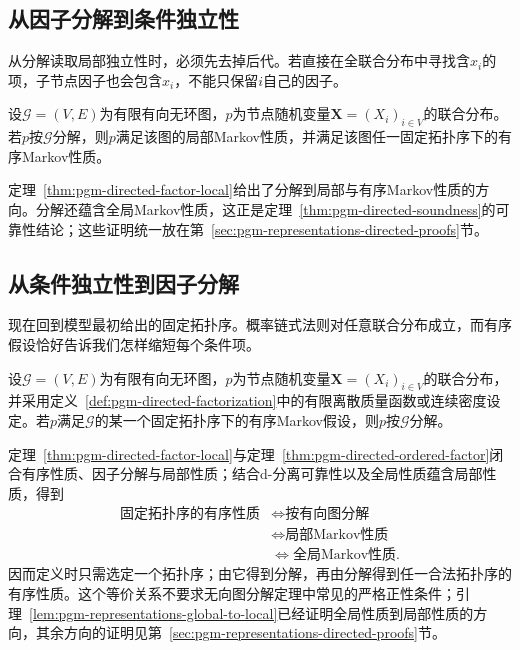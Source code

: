 \subsection{从因子分解到条件独立性}
\label{sec:pgm-directed-factor-to-ci}

从分解读取局部独立性时，必须先去掉后代。若直接在全联合分布中寻找含$x_i$的项，子节点因子也会包含$x_i$，不能只保留$i$自己的因子。

\begin{theorem}[分解蕴含局部与有序Markov性质]
  \label{thm:pgm-directed-factor-local}
  设$\mathcal{G}=(V,E)$为有限有向无环图，$p$为节点随机变量$\bm{X}=(X_i)_{i\in V}$的联合分布。若$p$按$\mathcal{G}$分解，则$p$满足该图的局部Markov性质，并满足该图任一固定拓扑序下的有序Markov性质。
\end{theorem}

定理~\ref{thm:pgm-directed-factor-local}给出了分解到局部与有序Markov性质的方向。分解还蕴含全局Markov性质，这正是定理~\ref{thm:pgm-directed-soundness}的可靠性结论；这些证明统一放在第~\ref{sec:pgm-representations-directed-proofs}节。

\subsection{从条件独立性到因子分解}
\label{sec:pgm-directed-ci-to-factor}

现在回到模型最初给出的固定拓扑序。概率链式法则对任意联合分布成立，而有序假设恰好告诉我们怎样缩短每个条件项。

\begin{theorem}[有序假设导出有向分解]
  \label{thm:pgm-directed-ordered-factor}
  设$\mathcal{G}=(V,E)$为有限有向无环图，$p$为节点随机变量$\bm{X}=(X_i)_{i\in V}$的联合分布，并采用定义~\ref{def:pgm-directed-factorization}中的有限离散质量函数或连续密度设定。若$p$满足$\mathcal{G}$的某一个固定拓扑序下的有序Markov假设，则$p$按$\mathcal{G}$分解。
\end{theorem}

定理~\ref{thm:pgm-directed-factor-local}与定理~\ref{thm:pgm-directed-ordered-factor}闭合有序性质、因子分解与局部性质；结合d-分离可靠性以及全局性质蕴含局部性质，得到
\begin{equation}
  \begin{aligned}
    \text{固定拓扑序的有序性质}
      &\Longleftrightarrow \text{按有向图分解}\\
      &\Longleftrightarrow \text{局部Markov性质}\\
      &\Longleftrightarrow \text{全局Markov性质}.
  \end{aligned}
  \label{eq:pgm-directed-equivalence}
\end{equation}
因而定义时只需选定一个拓扑序；由它得到分解，再由分解得到任一合法拓扑序的有序性质。这个等价关系不要求无向图分解定理中常见的严格正性条件；引理~\ref{lem:pgm-representations-global-to-local}已经证明全局性质到局部性质的方向，其余方向的证明见第~\ref{sec:pgm-representations-directed-proofs}节。

